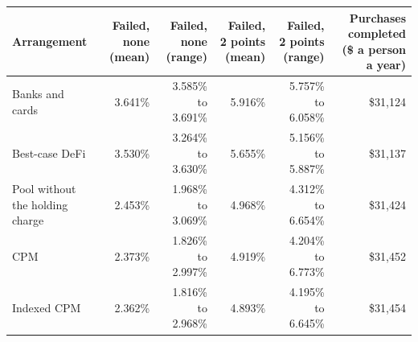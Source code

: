 \begin{tabular}{lrrrrr}
\toprule
Arrangement & Failed, none (mean) & Failed, none (range) & Failed, 2 points (mean) & Failed, 2 points (range) & Purchases completed (\$ a person a year) \\
\midrule
Banks and cards & 3.641\% & 3.585\% to 3.691\% & 5.916\% & 5.757\% to 6.058\% & \$31{,}124 \\
Best-case DeFi & 3.530\% & 3.264\% to 3.630\% & 5.655\% & 5.156\% to 5.887\% & \$31{,}137 \\
Pool without the holding charge & 2.453\% & 1.968\% to 3.069\% & 4.968\% & 4.312\% to 6.654\% & \$31{,}424 \\
CPM & 2.373\% & 1.826\% to 2.997\% & 4.919\% & 4.204\% to 6.773\% & \$31{,}452 \\
Indexed CPM & 2.362\% & 1.816\% to 2.968\% & 4.893\% & 4.195\% to 6.645\% & \$31{,}454 \\
\bottomrule
\end{tabular}

